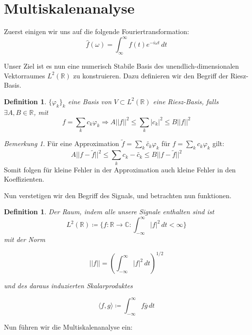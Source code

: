 \documentclass[]{scrartcl}
\theoremstyle{plain}
\newtheorem{defn}[theo]{Definition}
\theoremstyle{remark}
\newtheorem*{bem}{Bemerkung}
\newcommand{\lR}{L^2(\mathbb{R})}
\begin{document}
    \section{Multiskalenanalyse}

    Zuerst einigen wir uns auf die folgende Fouriertransformation:
    $$\hat{f}(\omega) = \int_\infty^\infty f(t) e^{-i \omega t} \, dt$$

    Unser Ziel ist es nun eine numerisch Stabile Basis des unendlich-dimensionalen Vektorraumes $L^2(\mathbb{R})$ zu konstruieren. Dazu definieren wir den Begriff der Riesz-Basis.

    \begin{defn}
        $\{\varphi_k\}_k$ eine Basis von $V \subset \lR$ eine Riesz-Basis, falls 
        $\exists A, B \in \mathbb{R}$, mit
        $$f = \sum_k c_k \varphi_k \Rightarrow A ||f||^2 \le \sum_k |c_k|^2 \le B ||f||^2$$
    \end{defn}

    \begin{bem}
        Für eine Approximation $\tilde{f} = \sum_k \tilde{c_k} \varphi_k$ für $f = \sum_k c_k \varphi_k$ gilt:
        $$A||f-\tilde{f}||^2 \le \sum_k c_k - \tilde{c_k} \le B ||f - \tilde{f}||^2$$
        Somit folgen für kleine Fehler in der Approximation auch kleine Fehler in den Koeffizienten.  
    \end{bem}

    Nun verstetigen wir den Begriff des Signals, und betrachten nun funktionen.

    \begin{defn} Der Raum, indem alle unsere Signale enthalten sind ist
        $$
        L^2(\mathbb{R}) \coloneqq \{f: \mathbb{R} \to \mathbb{C}:
        \int_{-\infty}^\infty |f|^2 \, dt < \infty\}
        $$
        mit der Norm

        $$||f|| = (\int_{-\infty}^\infty |f|^2 \, dt)^{1/2}$$

        und des daraus induzierten Skalarproduktes

        $$\langle f, g \rangle \coloneqq \int_{-\infty}^\infty f \overline{g} \, dt$$
    \end{defn}

    Nun führen wir die Multiskalenanalyse ein:
\end{document}
